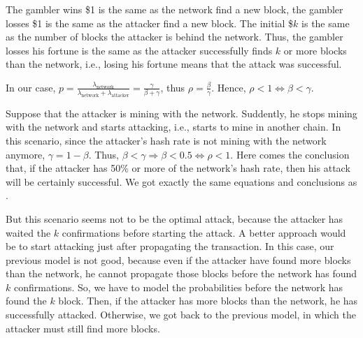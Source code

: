 
The gambler wins \$1 is the same as the network find a new block, the gambler losses \$1 is the same as the attacker find a new block. The initial \$$k$ is the same as the number of blocks the attacker is behind the network. Thus, the gambler losses his fortune is the same as the attacker successfully finds $k$ or more blocks than the network, i.e., losing his fortune means that the attack was successful.

In our case, $p = \frac{\lambda_{\text{network}}}{\lambda_{\text{network}} + \lambda_{\text{attacker}}} = \frac{\gamma}{\beta + \gamma}$, thus $\rho = \frac{\beta}{\gamma}$. Hence, $\rho < 1 \Leftrightarrow \beta < \gamma$.

Suppose that the attacker is mining with the network. Suddently, he stops mining with the network and starts attacking, i.e., starts to mine in another chain. In this scenario, since the attacker's hash rate is not mining with the network anymore, $\gamma = 1 - \beta$. Thus, $\beta < \gamma \Rightarrow \beta < 0.5 \Leftrightarrow \rho < 1$. Here comes the conclusion that, if the attacker has 50\% or more of the network's hash rate, then his attack will be certainly successful. We got exactly the same equations and conclusions as \cite{nakamoto2008bitcoin}.

But this scenario seems not to be the optimal attack, because the attacker has waited the $k$ confirmations before starting the attack. A better approach would be to start attacking just after propagating the transaction. In this case, our previous model is not good, because even if the attacker have found more blocks than the network, he cannot propagate those blocks before the network has found $k$ confirmations. So, we have to model the probabilities before the network has found the $k$ block. Then, if the attacker has more blocks than the network, he has successfully attacked. Otherwise, we got back to the previous model, in which the attacker must still find more blocks.

